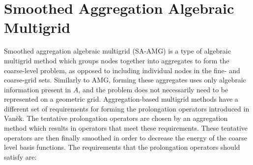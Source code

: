 
\section{Smoothed Aggregation Algebraic Multigrid}
Smoothed aggregation algebraic multigrid (SA-AMG) is a type of algebraic multigrid method which groups nodes together into aggregates to form the coarse-level problem, as opposed to including individual nodes in the fine- and coarse-grid sets. Similarly to AMG, forming these aggregates uses only algebraic information present in $A$, and the problem does not necessarily need to be represented on a geometric grid. Aggregation-based multigrid methods have a different set of requirements for forming the prolongation operators introduced in Van\u{e}k. The tentative prolongation operators are chosen by an aggregation method which results in operators that meet these requirements. These tentative operators are then finally smoothed in order to decrease the energy of the coarse level basis functions. The requirements that the prolongation operators should satisfy are:

